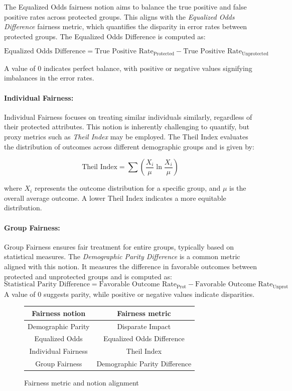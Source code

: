 The Equalized Odds fairness notion aims to balance the true positive and false positive rates across protected groups. This aligns with the \emph{Equalized Odds Difference} fairness metric, which quantifies the disparity in error rates between protected groups. The Equalized Odds Difference is computed as:

\[
\text{Equalized Odds Difference} = \text{True Positive Rate}_{\text{Protected}} - \text{True Positive Rate}_{\text{Unprotected}}
\]

A value of 0 indicates perfect balance, with positive or negative values signifying imbalances in the error rates.

\paragraph{Individual Fairness:}

Individual Fairness focuses on treating similar individuals similarly, regardless of their protected attributes. This notion is inherently challenging to quantify, but proxy metrics such as \emph{Theil Index} may be employed. The Theil Index evaluates the distribution of outcomes across different demographic groups and is given by:

\[
\text{Theil Index} = \sum \left( \frac{X_{i}}{\mu} \ln \frac{X_{i}}{\mu} \right)
\]

where \(X_{i}\) represents the outcome distribution for a specific group, and \(\mu\) is the overall average outcome. A lower Theil Index indicates a more equitable distribution.

\paragraph{Group Fairness:}

Group Fairness ensures fair treatment for entire groups, typically based on statistical measures. The \emph{Demographic Parity Difference} is a common metric aligned with this notion. It measures the difference in favorable outcomes between protected and unprotected groups and is computed as:
\[
\text{Statistical Parity Difference} = \text{Favorable Outcome Rate}_{\text{Prot}} - \text{Favorable Outcome Rate}_{\text{Unprot}}
\]
A value of 0 suggests parity, while positive or negative values indicate disparities.

\begin{figure}[H]
    \centering
    \begin{tabular}{|c|c|}
        \hline
        \textbf{Fairness notion} & \textbf{Fairness metric} \\
        \hline
        Demographic Parity & Disparate Impact \\
        \hline
        Equalized Odds & Equalized Odds Difference \\
        \hline
        Individual Fairness & Theil Index \\
        \hline
        Group Fairness & Demographic Parity Difference \\
        \hline
    \end{tabular}
    \caption{Fairness metric and notion alignment}
    \label{fig:alignment}
\end{figure}


